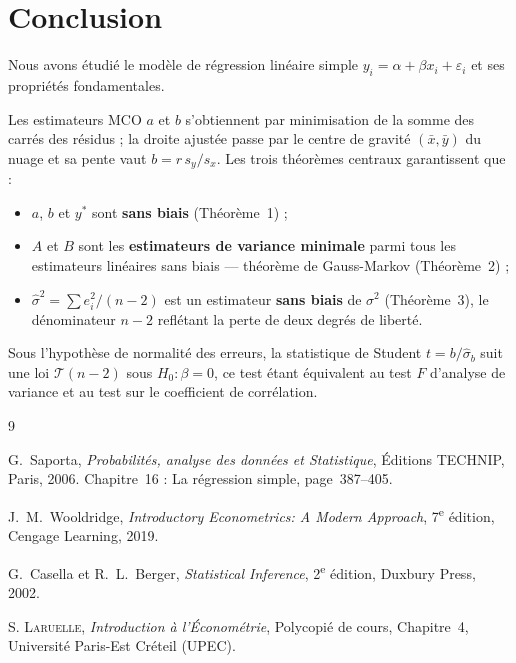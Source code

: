 \documentclass[12pt,a4paper]{article}
\theoremstyle{definition}
\theoremstyle{remark}
\newcommand{\xbar}{\bar{x}}
\newcommand{\ybar}{\bar{y}}
\begin{document}

\section{Conclusion}

Nous avons étudié le modèle de régression linéaire simple $y_i = \alpha + \beta x_i + \varepsilon_i$ et ses propriétés fondamentales.

Les estimateurs MCO $a$ et $b$ s'obtiennent par minimisation de la somme des carrés des
résidus ; la droite ajustée passe par le centre de gravité $(\xbar, \ybar)$ du nuage
et sa pente vaut $b = r\,s_y/s_x$. Les trois théorèmes centraux garantissent que :
\begin{itemize}
  \item $a$, $b$ et $y^*$ sont \textbf{sans biais} (Théorème~1) ;
  \item $A$ et $B$ sont les \textbf{estimateurs de variance minimale} parmi tous les
        estimateurs linéaires sans biais --- théorème de Gauss-Markov (Théorème~2) ;
  \item $\hat{\sigma}^2 = \sum e_i^2/(n-2)$ est un estimateur \textbf{sans biais} de
        $\sigma^2$ (Théorème~3), le dénominateur $n-2$ reflétant la perte de deux
        degrés de liberté.
\end{itemize}
Sous l'hypothèse de normalité des erreurs, la statistique de Student $t = b/\hat{\sigma}_b$
suit une loi $\mathcal{T}(n-2)$ sous $H_0 : \beta = 0$, ce test étant équivalent au
test $F$ d'analyse de variance et au test sur le coefficient de corrélation.





\begin{thebibliography}{9}

G.~Saporta,
\textit{Probabilités, analyse des données et Statistique},
Éditions TECHNIP, Paris, 2006.
Chapitre~16 : La régression simple, page~387--405.

J.~M.~Wooldridge,
\textit{Introductory Econometrics: A Modern Approach},
7\textsuperscript{e} édition, Cengage Learning, 2019.

G.~Casella et R.~L.~Berger,
\textit{Statistical Inference},
2\textsuperscript{e} édition, Duxbury Press, 2002.

\textsc{S. Laruelle},
\textit{Introduction à l'Économétrie},
Polycopié de cours, Chapitre~4, Université Paris-Est Créteil (UPEC).

\end{thebibliography}
\end{document}
